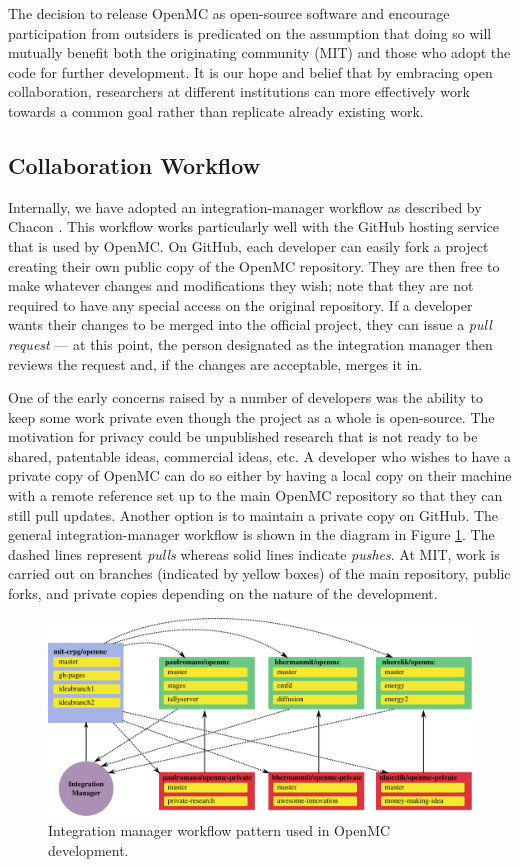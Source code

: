 \documentclass{ansconf}
\begin{document}
The decision to release OpenMC as open-source software and encourage
participation from outsiders is predicated on the assumption that doing so will
mutually benefit both the originating community (MIT) and those who adopt the
code for further development. It is our hope and belief that by embracing open
collaboration, researchers at different institutions can more effectively work
towards a common goal rather than replicate already existing work.

\subsection{Collaboration Workflow}

Internally, we have adopted an integration-manager workflow as described by
Chacon \cite{chacon-2009}. This workflow works particularly well with the GitHub
hosting service that is used by OpenMC. On GitHub, each developer can easily
fork a project creating their own public copy of the OpenMC repository. They are
then free to make whatever changes and modifications they wish; note that they
are not required to have any special access on the original repository. If a
developer wants their changes to be merged into the official project, they can
issue a \emph{pull request} --- at this point, the person designated as the
integration manager then reviews the request and, if the changes are acceptable,
merges it in.

One of the early concerns raised by a number of developers was the ability to
keep some work private even though the project as a whole is open-source. The
motivation for privacy could be unpublished research that is not ready to be
shared, patentable ideas, commercial ideas, etc. A developer who wishes to have
a private copy of OpenMC can do so either by having a local copy on their
machine with a remote reference set up to the main OpenMC repository so that
they can still pull updates. Another option is to maintain a private copy on
GitHub. The general integration-manager workflow is shown in the diagram in
Figure \ref{fig:workflow}. The dashed lines represent \emph{pulls} whereas solid
lines indicate \emph{pushes}. At MIT, work is carried out on branches (indicated
by yellow boxes) of the main repository, public forks, and private copies
depending on the nature of the development.

\begin{figure}[!htb]
  \centering
  \includegraphics[width=6.5in]{integration-manager}
  \caption{Integration manager workflow pattern used in OpenMC development.}
  \label{fig:workflow}
\end{figure}
\end{document}
